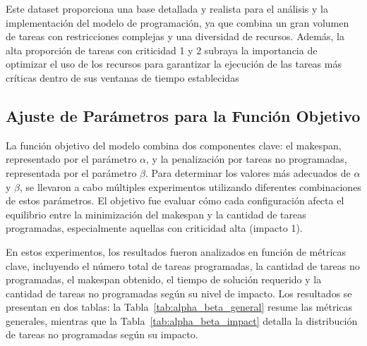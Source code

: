 \documentclass{article}
\begin{document}
Este dataset proporciona una base detallada y realista para el análisis y la implementación del modelo de programación, ya que combina un gran volumen de tareas con restricciones complejas y una diversidad de recursos. Además, la alta proporción de tareas con criticidad 1 y 2 subraya la importancia de optimizar el uso de los recursos para garantizar la ejecución de las tareas más críticas dentro de sus ventanas de tiempo establecidas

\subsection{Ajuste de Parámetros para la Función Objetivo}

La función objetivo del modelo combina dos componentes clave: el makespan, representado por el parámetro \( \alpha \), y la penalización por tareas no programadas, representada por el parámetro \( \beta \). Para determinar los valores más adecuados de \( \alpha \) y \( \beta \), se llevaron a cabo múltiples experimentos utilizando diferentes combinaciones de estos parámetros. El objetivo fue evaluar cómo cada configuración afecta el equilibrio entre la minimización del makespan y la cantidad de tareas programadas, especialmente aquellas con criticidad alta (impacto 1).

En estos experimentos, los resultados fueron analizados en función de métricas clave, incluyendo el número total de tareas programadas, la cantidad de tareas no programadas, el makespan obtenido, el tiempo de solución requerido y la cantidad de tareas no programadas según su nivel de impacto. Los resultados se presentan en dos tablas: la Tabla~\ref{tab:alpha_beta_general} resume las métricas generales, mientras que la Tabla~\ref{tab:alpha_beta_impact} detalla la distribución de tareas no programadas según su impacto.
\end{document}
